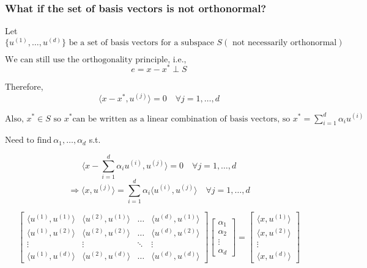     \subsubsection{What if the set of basis vectors is not orthonormal?}
    \begin{derivation}
        Let $\{u^{(1)}, \dots, u^{(d)}\} \text{ be a set of basis vectors for a subspace } S (\text{ not necessarily orthonormal})$
        \vspace{1em}

        $\text{We can still use the orthogonality principle, i.e.,}$
        \[
        e = x - x^* \perp S
        \]
        \vspace{1em}

        Therefore, 
        \[
        \langle x - x^*, u^{(j)} \rangle = 0 \quad \forall j = 1, \dots, d 
        \]
        
        $\text{Also, } x^* \in S \text{ so } x^* \text{can be written as a linear combination of basis vectors, so } x^* = \sum_{i=1}^{d} \alpha_i u^{(i)}$
        \vspace{1em}
        
        $\text{Need to find} \ \alpha_1, \dots, \alpha_d$ s.t.

        \[
        \langle x - \sum_{i=1}^{d} \alpha_i u^{(i)}, u^{(j)} \rangle = 0 \quad \forall j = 1, \dots, d
        \]
        \[
        \Rightarrow \langle x, u^{(j)} \rangle = \sum_{i=1}^{d} \alpha_i \langle u^{(i)}, u^{(j)} \rangle \quad \forall j = 1, \dots, d
        \]

        \[
        \begin{bmatrix}
        \langle u^{(1)}, u^{(1)} \rangle & \langle u^{(2)}, u^{(1)} \rangle & \dots & \langle u^{(d)}, u^{(1)} \rangle \\
        \langle u^{(1)}, u^{(2)} \rangle & \langle u^{(2)}, u^{(2)} \rangle & \dots & \langle u^{(d)}, u^{(2)} \rangle \\
        \vdots & \vdots & \ddots & \vdots \\
        \langle u^{(1)}, u^{(d)} \rangle & \langle u^{(2)}, u^{(d)} \rangle & \dots & \langle u^{(d)}, u^{(d)} \rangle
        \end{bmatrix}
        \begin{bmatrix}
        \alpha_1 \\
        \alpha_2 \\
        \vdots \\
        \alpha_d
        \end{bmatrix}
        =
        \begin{bmatrix}
        \langle x, u^{(1)} \rangle \\
        \langle x, u^{(2)} \rangle \\
        \vdots \\
        \langle x, u^{(d)} \rangle
        \end{bmatrix}
        \]


\end{derivation}
